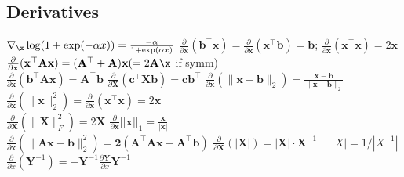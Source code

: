 \subsection*{Derivatives}
$\nabla_\x\log(1+\exp(-\alpha x))=\frac{-\alpha}{1+\exp(\alpha x)}$
$\frac{\partial}{\partial \mathbf{x}}(\mathbf{b}^\top \mathbf{x}) = \frac{\partial}{\partial \mathbf{x}}(\mathbf{x}^\top \mathbf{b}) = \mathbf{b}$;
$\frac{\partial}{\partial \mathbf{x}}(\mathbf{x}^\top \mathbf{x}) = 2\mathbf{x}$ \\
$\frac{\partial}{\partial \mathbf{x}}(\mathbf{x}^\top \mathbf{A}\mathbf{x}) = (\mathbf{A}^\top + \mathbf{A})\mathbf{x} (= 2\mathbf{A}\x$ if symm) \quad\\
$\frac{\partial}{\partial \mathbf{x}}(\mathbf{b}^\top \mathbf{A}\mathbf{x}) = \mathbf{A}^\top \mathbf{b}$ \quad
$\frac{\partial}{\partial \mathbf{X}}(\mathbf{c}^\top \mathbf{X} \mathbf{b}) = \mathbf{c}\mathbf{b}^\top$ \quad
$\frac{\partial}{\partial \mathbf{x}}(\| \mathbf{x}-\mathbf{b} \|_2) = \frac{\mathbf{x}-\mathbf{b}}{\|\mathbf{x}-\mathbf{b}\|_2}$ \\
$\frac{\partial}{\partial \mathbf{x}}(\|\mathbf{x}\|^2_2) = \frac{\partial}{\partial \mathbf{x}} (\mathbf{x}^\top \mathbf{x}) = 2\mathbf{x}$ \quad
\\$\frac{\partial}{\partial \mathbf{X}}(\|\mathbf{X}\|_F^2) = 2\mathbf{X}$  \quad \quad
$\frac{\partial}{\partial \mathbf{x}}||\mathbf{x}||_1 = \frac{\mathbf{x}}{|\mathbf{x}|}$ \\
$\frac{\partial}{\partial \mathbf{x}}(\|\mathbf{Ax - b}\|_2^2) = \mathbf{2(A^\top Ax-A^\top b)}$ \quad
$\frac{\partial}{\partial \mathbf{X}}(|\mathbf{X}|) = |\mathbf{X}|\cdot \mathbf{X}^{-1}$ $\quad |X| = 1 / |X^{-1}|$\\
$\frac{\partial}{\partial x}(\mathbf{Y}^{-1}) = -\mathbf{Y}^{-1} \frac{\partial\mathbf{Y}}{\partial x} \mathbf{Y}^{-1}$
